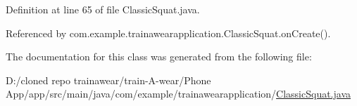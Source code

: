 Definition at line 65 of file Classic\+Squat.\+java.



Referenced by com.\+example.\+trainawearapplication.\+Classic\+Squat.\+on\+Create().



The documentation for this class was generated from the following file\+:\begin{DoxyCompactItemize}
\item 
D\+:/cloned repo trainawear/train-\/\+A-\/wear/\+Phone App/app/src/main/java/com/example/trainawearapplication/\mbox{\hyperlink{_classic_squat_8java}{Classic\+Squat.\+java}}\end{DoxyCompactItemize}
